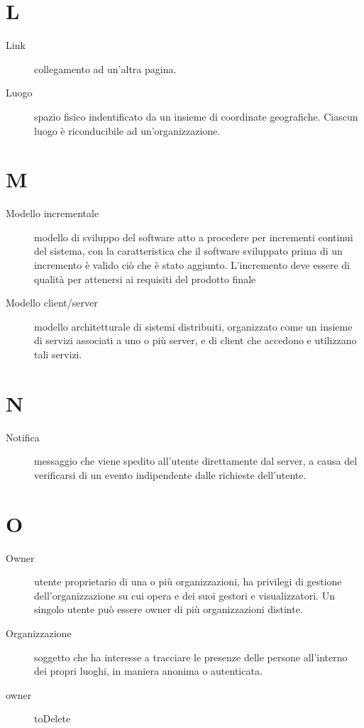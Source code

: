 \documentclass{article}
\begin{document}
	\section{L}
	\begin{description}
		\item[Link] collegamento ad un'altra pagina.
		\item[Luogo] spazio fisico indentificato da un insieme di coordinate geografiche. Ciascun luogo è riconducibile ad un'organizzazione.
	\end{description}
	\section{M}
	\begin{description}
		\item[Modello incrementale] modello di sviluppo del software atto a procedere per incrementi continui del sistema, con la caratteristica che il software sviluppato prima di un incremento è valido ciò che è stato aggiunto. L’incremento deve essere di qualità per attenersi ai requisiti del prodotto finale
		\item[Modello client/server] modello architetturale di sistemi distribuiti, organizzato come un insieme di servizi associati a uno o più server, e di client che accedono e utilizzano tali servizi.
	\end{description}
	\section{N}
	\begin{description}
		\item[Notifica] messaggio che viene spedito all'utente direttamente dal server, a causa del verificarsi di un evento indipendente dalle richieste dell'utente.
	\end{description}
	\section{O}
	\begin{description}
		\item[Owner] utente proprietario di una o più organizzazioni, ha privilegi di gestione dell'organizzazione su cui opera e dei suoi gestori e visualizzatori. Un singolo utente può essere owner di più organizzazioni distinte.
		\item[Organizzazione] soggetto che ha interesse a tracciare le presenze delle persone all’interno dei propri luoghi, in maniera anonima o autenticata.
		\item[owner] toDelete
	\end{description}
\end{document}
